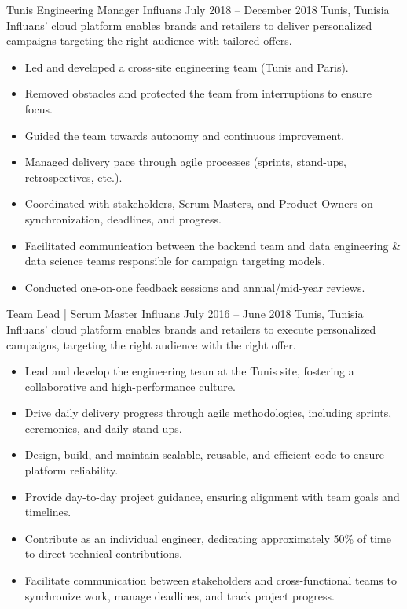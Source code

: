 \documentclass[10pt,a4paper]{resume-settings}
\begin{document}
\divider

\divider

\clearpage


\cvevent
    {Tunis Engineering Manager}
    {Influans}
    {July 2018 -- December 2018}
    {Tunis, Tunisia}
    {Influans' cloud platform enables brands and retailers to deliver personalized campaigns targeting the right audience with tailored offers.}
    \begin{itemize}
        \item Led and developed a cross-site engineering team (Tunis and Paris).
        \item Removed obstacles and protected the team from interruptions to ensure focus.
        \item Guided the team towards autonomy and continuous improvement.
        \item Managed delivery pace through agile processes (sprints, stand-ups, retrospectives, etc.).
        \item Coordinated with stakeholders, Scrum Masters, and Product Owners on synchronization, deadlines, and progress.
        \item Facilitated communication between the backend team and data engineering & data science teams responsible for campaign targeting models.
        \item Conducted one-on-one feedback sessions and annual/mid-year reviews.
    \end{itemize}
\divider
\divider

\cvevent
    {Team Lead | Scrum Master}
    {Influans}
    {July 2016 -- June 2018}
    {Tunis, Tunisia}
    {Influans' cloud platform enables brands and retailers to execute personalized campaigns, targeting the right audience with the right offer.}
    \begin{itemize}
        \item Lead and develop the engineering team at the Tunis site, fostering a collaborative and high-performance culture.
        \item Drive daily delivery progress through agile methodologies, including sprints, ceremonies, and daily stand-ups.
        \item Design, build, and maintain scalable, reusable, and efficient code to ensure platform reliability.
        \item Provide day-to-day project guidance, ensuring alignment with team goals and timelines.
        \item Contribute as an individual engineer, dedicating approximately 50\% of time to direct technical contributions.
        \item Facilitate communication between stakeholders and cross-functional teams to synchronize work, manage deadlines, and track project progress.
    \end{itemize}
\divider
\end{document}
